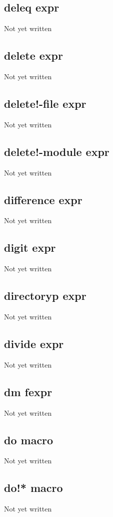 \documentclass[a4paper,11pt]{article}
\begin{document}
{\subsection{\ttfamily deleq expr}
   Not yet written

\subsection{\ttfamily delete expr}
   Not yet written

\subsection{\ttfamily delete!-file expr}
   Not yet written

\subsection{\ttfamily delete!-module expr}
   Not yet written

\subsection{\ttfamily difference expr}
   Not yet written

\subsection{\ttfamily digit expr}
   Not yet written

\subsection{\ttfamily directoryp expr}
   Not yet written

\subsection{\ttfamily divide expr}
   Not yet written

\subsection{\ttfamily dm fexpr}
   Not yet written

\subsection{\ttfamily do macro}
   Not yet written

\subsection{\ttfamily do!* macro}
   Not yet written

}
\end{document}

